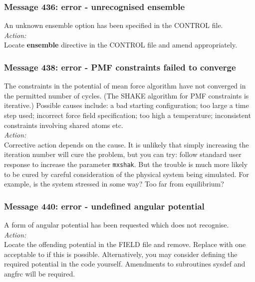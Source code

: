 \subsubsection*{Message 436: error - unrecognised ensemble }

An unknown ensemble option has been specified in the CONTROL file.\\

\noindent
{\em Action:} \\
Locate {\bf ensemble} directive in the CONTROL file and amend
appropriately.

\subsubsection*{Message 438: error - PMF constraints failed to
converge}

The constraints in the potential of mean force algorithm have not
converged in the permitted number of cycles. (The SHAKE
algorithm  for
PMF constraints is iterative.) Possible causes
include: a bad starting configuration; too large a time step used;
incorrect force field specification; too high a temperature;
inconsistent constraints involving shared atoms etc. \\

\noindent
{\em Action:} 
\\ Corrective action depends on
the cause. It is unlikely that simply increasing the iteration number
will cure the problem, but you can try: follow standard user response
to increase the parameter {\tt mxshak}. But the trouble is much more
likely to be cured by careful consideration of the physical system
being simulated. For example, is the system stressed in some way? Too
far from equilibrium?

\subsubsection*{Message 440: error - undefined angular potential}

A form of angular potential has been requested which
\D{} does not recognise.  \\

\noindent
{\em Action:} \\ Locate the offending potential in the FIELD file and
remove. Replace with one acceptable to \D{} if this is possible.
Alternatively, you may consider defining the required
potential in the code yourself. Amendments to subroutines {\sc sysdef}
and {\sc angfrc} will be required.

